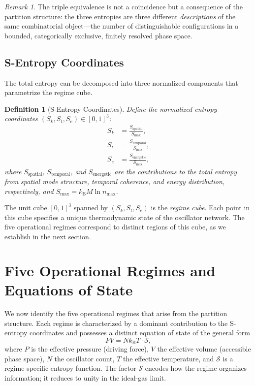\documentclass[aps,prd,twocolumn,superscriptaddress,floatfix,nofootinbib]{revtex4-2}
\newtheorem{definition}[theorem]{Definition}
\theoremstyle{remark}
\newtheorem{remark}[theorem]{Remark}
\newcommand{\kB}{k_{\mathrm{B}}}
\newcommand{\Sk}{S_k}
\newcommand{\St}{S_t}
\newcommand{\Se}{S_e}
\newcommand{\Sregime}{\mathcal{S}}
\begin{document}
\begin{remark}
The triple equivalence is not a coincidence but a consequence of the partition structure: the three entropies are three different \emph{descriptions} of the same combinatorial object---the number of distinguishable configurations in a bounded, categorically exclusive, finitely resolved phase space.
\end{remark}

\subsection{S-Entropy Coordinates}

The total entropy can be decomposed into three normalized components that parametrize the regime cube.

\begin{definition}[S-Entropy Coordinates]
\label{def:s_coords}
Define the normalized entropy coordinates $(\Sk, \St, \Se) \in [0,1]^3$:
\begin{align}
    \Sk &= \frac{S_{\text{spatial}}}{S_{\max}}, \label{eq:sk}\\
    \St &= \frac{S_{\text{temporal}}}{S_{\max}}, \label{eq:st}\\
    \Se &= \frac{S_{\text{energetic}}}{S_{\max}}, \label{eq:se}
\end{align}
where $S_{\text{spatial}}$, $S_{\text{temporal}}$, and $S_{\text{energetic}}$ are the contributions to the total entropy from spatial mode structure, temporal coherence, and energy distribution, respectively, and $S_{\max} = \kB M \ln n_{\max}$.
\end{definition}

The unit cube $[0,1]^3$ spanned by $(\Sk, \St, \Se)$ is the \emph{regime cube}. Each point in this cube specifies a unique thermodynamic state of the oscillator network. The five operational regimes correspond to distinct regions of this cube, as we establish in the next section.

\section{Five Operational Regimes and Equations of State}
\label{sec:regimes}

We now identify the five operational regimes that arise from the partition structure. Each regime is characterized by a dominant contribution to the S-entropy coordinates and possesses a distinct equation of state of the general form
\begin{equation}
    PV = N\kB T \cdot \Sregime,
    \label{eq:general_eos}
\end{equation}
where $P$ is the effective pressure (driving force), $V$ the effective volume (accessible phase space), $N$ the oscillator count, $T$ the effective temperature, and $\Sregime$ is a regime-specific entropy function. The factor $\Sregime$ encodes how the regime organizes information; it reduces to unity in the ideal-gas limit.
\end{document}
